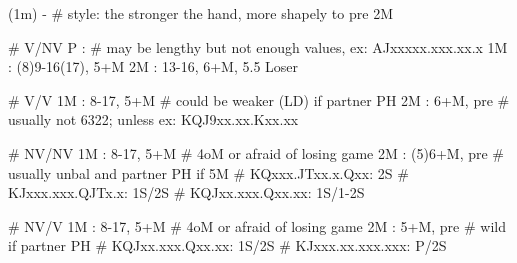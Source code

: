 (1m) -
# style: the stronger the hand, more shapely to pre 2M

# V/NV 
P  : # may be lengthy but not enough values, ex: AJxxxxx.xxx.xx.x
1M : (8)9-16(17), 5+M
2M : 13-16, 6+M, 5.5 Loser

# V/V
1M : 8-17, 5+M  # could be weaker (LD) if partner PH
2M : 6+M, pre  # usually not 6322; unless ex: KQJ9xx.xx.Kxx.xx

# NV/NV
1M : 8-17, 5+M  # 4oM or afraid of losing game
2M : (5)6+M, pre  # usually unbal and partner PH if 5M
# KQxxx.JTxx.x.Qxx: 2S
# KJxxx.xxx.QJTx.x: 1S/2S
# KQJxx.xxx.Qxx.xx: 1S/1-2S

# NV/V 
1M : 8-17, 5+M  # 4oM or afraid of losing game
2M : 5+M, pre  # wild if partner PH 
# KQJxx.xxx.Qxx.xx: 1S/2S
# KJxxx.xx.xxx.xxx: P/2S